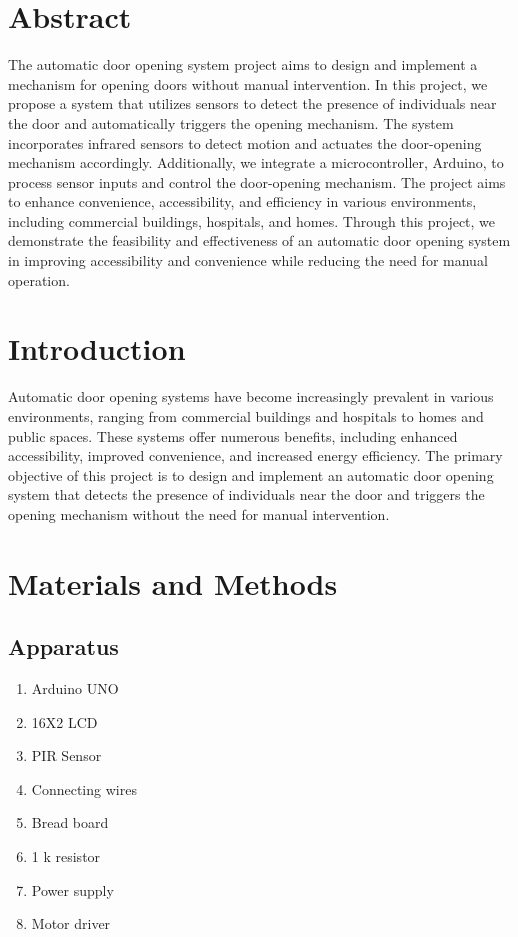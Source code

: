 \documentclass{article}
\begin{document}

\section*{Abstract}
The automatic door opening system project aims to design and implement a mechanism for opening doors without manual intervention. In this project, we propose a system that utilizes sensors to detect the presence of individuals near the door and automatically triggers the opening mechanism. The system incorporates infrared sensors to detect motion and actuates the door-opening mechanism accordingly. Additionally, we integrate a microcontroller, Arduino, to process sensor inputs and control the door-opening mechanism. The project aims to enhance convenience, accessibility, and efficiency in various environments, including commercial buildings, hospitals, and homes. Through this project, we demonstrate the feasibility and effectiveness of an automatic door opening system in improving accessibility and convenience while reducing the need for manual operation.


\section{Introduction}
Automatic door opening systems have become increasingly prevalent in various environments, ranging from commercial buildings and hospitals to homes and public spaces. These systems offer numerous benefits, including enhanced accessibility, improved convenience, and increased energy efficiency. The primary objective of this project is to design and implement an automatic door opening system that detects the presence of individuals near the door and triggers the opening mechanism without the need for manual intervention.

\section{Materials and Methods}
\subsection{Apparatus}
\begin{enumerate}
\item Arduino UNO
\item 16X2 LCD
\item PIR Sensor
\item Connecting wires
\item Bread board
\item 1 k resistor
\item Power supply
\item Motor driver
\end{enumerate}
\end{document}

